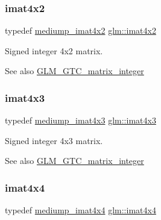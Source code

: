 \subsubsection{\texorpdfstring{imat4x2}{imat4x2}}
{\footnotesize\ttfamily typedef \hyperlink{group__gtc__matrix__integer_ga536fe339834f7e764672c22c63ec543b}{mediump\+\_\+imat4x2} \hyperlink{group__gtc__matrix__integer_ga7e733984837e0e7aa9f4aac18f632f63}{glm\+::imat4x2}}

Signed integer 4x2 matrix. \begin{DoxySeeAlso}{See also}
\hyperlink{group__gtc__matrix__integer}{G\+L\+M\+\_\+\+G\+T\+C\+\_\+matrix\+\_\+integer} 
\end{DoxySeeAlso}
\mbox{\label{group__gtc__matrix__integer_gaa4cca8e80c0603239eda452860063844}} 
\subsubsection{\texorpdfstring{imat4x3}{imat4x3}}
{\footnotesize\ttfamily typedef \hyperlink{group__gtc__matrix__integer_ga213644b63e6ee8ac783fd9a75e3c5abb}{mediump\+\_\+imat4x3} \hyperlink{group__gtc__matrix__integer_gaa4cca8e80c0603239eda452860063844}{glm\+::imat4x3}}

Signed integer 4x3 matrix. \begin{DoxySeeAlso}{See also}
\hyperlink{group__gtc__matrix__integer}{G\+L\+M\+\_\+\+G\+T\+C\+\_\+matrix\+\_\+integer} 
\end{DoxySeeAlso}
\mbox{\label{group__gtc__matrix__integer_ga367d8d5281ff82f1215a227dd2ea5ba9}} 
\subsubsection{\texorpdfstring{imat4x4}{imat4x4}}
{\footnotesize\ttfamily typedef \hyperlink{group__gtc__matrix__integer_gaf45ac606a3fb21f46228524d1d322eb2}{mediump\+\_\+imat4x4} \hyperlink{group__gtc__matrix__integer_ga367d8d5281ff82f1215a227dd2ea5ba9}{glm\+::imat4x4}}

